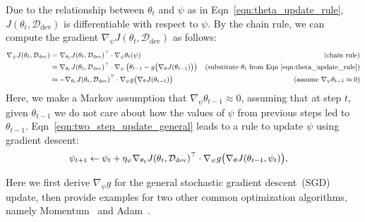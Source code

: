 Due to the relationship between $\theta_t$ and $\psi$ as in Eqn~\ref{eqn:theta_update_rule}, $J(\theta_t, \mathcal{D}_\text{dev})$ is differentiable with respect to $\psi$. 
By the chain rule, we can compute the gradient $\nabla_\psi J(\theta_t, \mathcal{D}_\text{dev})$ as follows:
\begin{equation}
  \label{eqn:two_step_update_general}
   \small
  \begin{aligned}
    \nabla_\psi J(\theta_t, \mathcal{D}_\text{dev})
      &= \nabla_{\theta_t} J(\theta_t, \mathcal{D}_\text{dev})^\top \cdot \nabla_\psi \theta_t(\psi) &\text{(chain rule)} \\
      &= \nabla_{\theta_t} J(\theta_t, \mathcal{D}_\text{dev})^\top \cdot \nabla_\psi \left( \theta_{t-1} - g\big( \nabla_\theta J(\theta_{t-1}) \big) \right) &\text{(substitute $\theta_t$ from Eqn~\ref{eqn:theta_update_rule})} \\
      &\approx -\nabla_{\theta_t} J(\theta_t, \mathcal{D}_\text{dev})^\top \cdot \nabla_\psi g\big( \nabla_\theta J(\theta_{t-1}) \big) &\text{(assume $\nabla_\psi \theta_{t-1} \approx 0$)} %
  \end{aligned}
\end{equation}
Here, we make a Markov assumption that $\nabla_\psi \theta_{t-1} \approx 0$, assuming that at step $t$, given $\theta_{t-1}$ we do not care about how the values of $\psi$ from previous steps led to $\theta_{t-1}$. Eqn~\ref{eqn:two_step_update_general} leads to a rule to update $\psi$ using gradient descent:
\begin{equation}
  \label{eqn:psi_update_rule}
   \small
  \begin{aligned}
    \psi_{t+1} 
      &\leftarrow \psi_t + \eta_\psi \nabla_{\theta_t} J(\theta_t, \mathcal{D}_\text{dev})^\top \cdot \nabla_\psi g\big( \nabla_\theta J(\theta_{t-1}, \psi_t) \big),
  \end{aligned}
\end{equation}


Here we first derive $\nabla_\psi g$ for the general stochastic gradient descent~(SGD) update, then provide examples for two other common optimization algorithms, namely Momentum~\citep{nesterov} and Adam~\citep{adam}.

